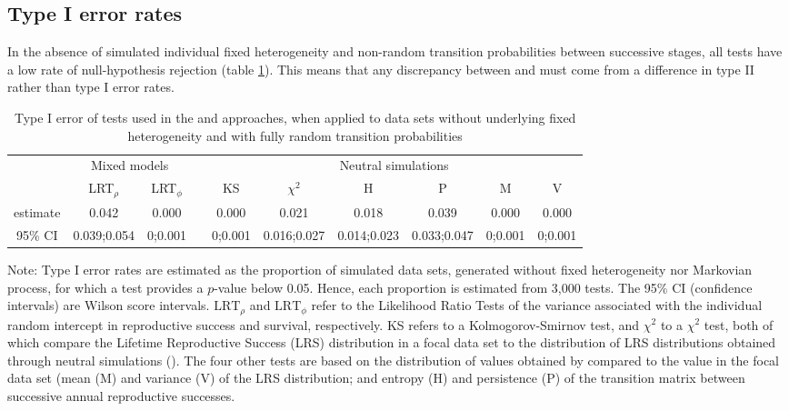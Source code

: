 \subsection{Type I error rates}
In the absence of simulated individual fixed heterogeneity and non-random transition probabilities between successive stages, all tests have a low rate of null-hypothesis rejection (table \ref{table:t1error}). This means that any discrepancy between \NSM and \MM must come from a difference in type II rather than type I error rates.
\begin{table}[ht]
\caption{Type I error of tests used in the \MM and \NSM approaches, when applied to data sets without underlying fixed heterogeneity and with fully random transition probabilities}
\begin{center}\scriptsize
\begin{tabular}{c c c c c c c c c c}
\toprule
& \multicolumn{2}{c}{Mixed models} & & \multicolumn{6}{c}{Neutral simulations}\\
\cmidrule{2-3} \cmidrule{5-10}%
& LRT$_\rho$ & LRT$_\phi$ & & KS & $\chi^2$ & H & P & M & V\\
\midrule
estimate & 0.042 			& 0.000 		& & 			0.000 & 0.021				& 0.018 			& 0.039 			& 0.000 		& 0.000\\
95\% CI & 0.039;0.054 &	0;0.001		& & 	0;0.001		& 0.016;0.027	& 0.014;0.023	& 0.033;0.047	& 0;0.001		&	0;0.001	\\
\bottomrule
\end{tabular}
\end{center}
{\scriptsize Note: Type I error rates are estimated as the proportion of simulated data sets, generated without fixed heterogeneity nor Markovian process, for which a test provides a $p$-value below 0.05. Hence, each proportion is estimated from 3,000 tests. The 95\% CI (confidence intervals) are Wilson score intervals. $\mathrm{LRT}_\rho$ and $\mathrm{LRT}_\phi$ refer to the Likelihood Ratio Tests of the variance associated with the individual random intercept in reproductive success and survival, respectively. KS refers to a Kolmogorov-Smirnov test, and $\chi^2$ to a $\chi^2$ test, both of which compare the Lifetime Reproductive Success (LRS) distribution in a focal data set to the distribution of LRS distributions obtained through neutral simulations (\NSM). The four other tests are based on the distribution of values obtained by \NSM compared to the value in the focal data set (mean (M) and variance (V) of the LRS distribution; and entropy (H) and persistence (P) of the transition matrix between successive annual reproductive successes.}
\label{table:t1error}
\end{table}

